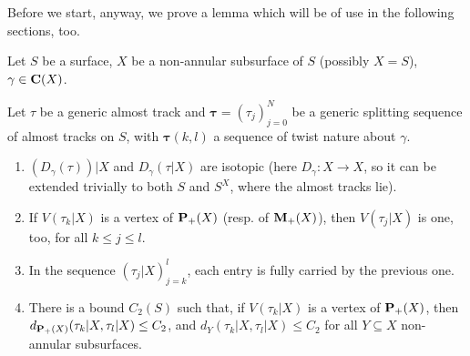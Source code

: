 Before we start, anyway, we prove a lemma which will be of use in the following sections, too.

\begin{lemma}\label{lem:pantsboundunderdt}
Let $S$ be a surface, $X$ be a non-annular subsurface of $S$ (possibly $X=S$), $\gamma\in \mathbf C(X)$.

Let $\tau$ be a generic almost track and $\bm\tau=(\tau_j)_{j=0}^N$ be a generic splitting sequence of almost tracks on $S$, with $\bm\tau(k,l)$ a sequence of twist nature about $\gamma$.

\begin{enumerate}
\item $\left(D_\gamma(\tau)\right)|X$ and $D_\gamma(\tau|X)$ are isotopic (here $D_\gamma:X\rightarrow X$, so it can be extended trivially to both $S$ and $S^X$, where the almost tracks lie).
\item If $V(\tau_k|X)$ is a vertex of ${\mathbf{P}_+}(X)$ (resp. of ${\mathbf{M}_+}(X)$), then $V(\tau_j|X)$ is one, too, for all $k\leq j\leq l$.
\item In the sequence $(\tau_j|X)_{j=k}^l$, each entry is fully carried by the previous one.
\item There is a bound $C_2(S)$ such that, if $V(\tau_k|X)$ is a vertex of ${\mathbf{P}_+}(X)$, then $d_{{\mathbf{P}_+}(X)}(\tau_k|X,\tau_l|X)\leq C_2$, and $d_Y\left(\tau_k|X,\tau_l|X\right)\leq C_2$ for all $Y\subseteq X$ non-annular subsurfaces.
\end{enumerate}
\end{lemma}
